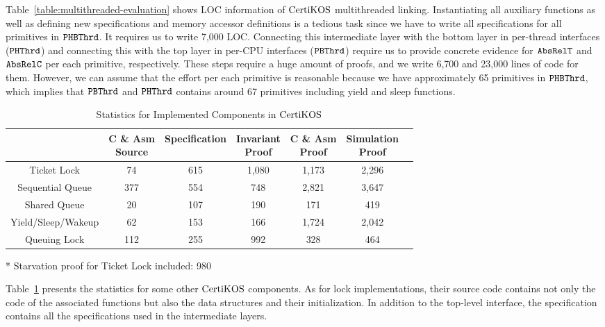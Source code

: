 Table~\ref{table:multithreaded-evaluation} shows LOC information of $\mathrm{CertiKOS}$ multithreaded linking.
Instantiating all auxiliary functions as well as defining new specifications and memory accessor definitions is a tedious task since
we have to write all specifications for all primitives in ${{\mathrm{\texttt{PHBThrd}}}}$. 
It requires us to write  7,000 LOC. 
Connecting this  intermediate layer with the bottom layer in per-thread interfaces (${{\mathrm{\texttt{PHThrd}}}}$) and 
connecting this with the top layer in per-CPU interfaces (${{\mathrm{\texttt{PBThrd}}}}$) require us 
to provide concrete evidence for ${{\mathrm{\texttt{AbsRelT}}}}$ and ${{\mathrm{\texttt{AbsRelC}}}}$ per each primitive, respectively.
These steps require a huge amount of proofs, and we write 6,700  and 23,000 lines of code for them. 
However,  we can assume that the effort per each primitive is reasonable because 
 we have approximately 65 primitives in ${{\mathrm{\texttt{PHBThrd}}}}$, which implies that  ${{\mathrm{\texttt{PBThrd}}}}$ and ${{\mathrm{\texttt{PHThrd}}}}$ contains around 67 primitives including yield and sleep functions.

\begin{table}
\begin{center}
\renewcommand{\arraystretch}{1.1}
\setlength{\tabcolsep}{0.3em}
\begin{tabular}{|c|c|c|c|c|c|c|}
\hline
 & \makecell{ C \& Asm \\Source} & Specification & \makecell{Invariant \\ Proof} & \makecell{C \& Asm \\Proof} & \makecell{Simulation \\ Proof} \\
\hline
Ticket Lock & 74 & 615 & 1,080 & 1,173 & 2,296 \\
\hline
Sequential Queue & 377 & 554 & 748 & 2,821& 3,647 \\
\hline
Shared Queue &  20 & 107 & 190 & 171& 419\\
\hline
Yield/Sleep/Wakeup & 62 & 153 & 166 & 1,724 & 2,042 \\
\hline
Queuing Lock & 112 & 255 & 992 & 328 & 464\\
\hline
\end{tabular}
\newline
\end{center}
\begin{flushright}
* Starvation proof for Ticket Lock included: 980\\
\end{flushright}
\caption{Statistics for Implemented Components in $\mathrm{CertiKOS}$}
\label{table:certikos-evaluation}
\hrulefill
\end{table}
Table~\ref{table:certikos-evaluation} presents  the statistics for some other  $\mathrm{CertiKOS}$ components.
 As for lock implementations, their source code contains not only the code of the associated functions but also the data structures and their initialization. In addition to the top-level interface, the specification contains all the specifications used in the intermediate layers.

